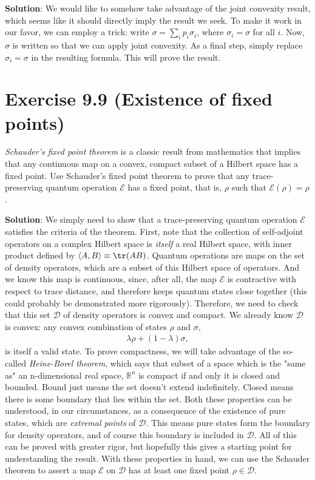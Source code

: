 \documentclass{book}
\newcommand{\mc}[1]{\mathcal{#1}}
\begin{document}
    \textbf{Solution}: We would like to somehow take advantage of the joint convexity result, which seems like it should directly imply the result we seek. To make it work in our favor, we can employ a trick: write $\sigma = \sum_i p_i \sigma_i$, where $\sigma_i = \sigma$ for all $i$. Now, $\sigma$ is written so that we can apply joint convexity. As a final step, simply replace $\sigma_i = \sigma$ in the resulting formula. This will prove the result. 
    
\section*{Exercise 9.9 (Existence of fixed points)} 
    \emph{Schauder's fixed point theorem} is a classic result from mathematics that implies that any continuous map on a convex, compact subset of a Hilbert space has a fixed point. Use Schauder’s fixed point theorem to prove that any trace-preserving quantum operation $\mc{E}$ has a fixed point, that is, $\rho$ such that $\mc{E}(\rho) = \rho$. 
    
    \textbf{Solution}: We simply need to show that a trace-preserving quantum operation $\mc{E}$ satisfies the criteria of the theorem. First, note that the collection of self-adjoint operators on a complex Hilbert space is \emph{itself} a real Hilbert space, with inner product defined by $\langle A, B \rangle \equiv \tr(A B)$. Quantum operations are maps on the set of density operators, which are a subset of this Hilbert space of operators. And we know this map is continuous, since, after all, the map $\mc{E}$ is contractive with respect to trace distance, and therefore keeps quantum states close together (this could probably be demonstrated more rigorously). Therefore, we need to check that this set $\mc{D}$ of density operators is convex and compact. We already know $\mc{D}$ is convex: any convex combination of states $\rho$ and $\sigma$, 
    \begin{align}
        \lambda \rho + (1-\lambda) \sigma,
    \end{align} is itself a valid state. To prove compactness, we will take advantage of the so-called \emph{Heine-Borel theorem}, which says that subset of a space which is the "same as" an n-dimensional real space, $\mathbb{R}^n$ is compact if and only it is closed and bounded. Bound just means the set doesn't extend indefinitely. Closed means there is some boundary that lies within the set. Both these properties can be understood, in our circumstances, as a consequence of the existence of pure states, which are \emph{extremal points} of $\mc{D}$. This means pure states form the boundary for density operators, and of course this boundary is included in $\mc{D}$. All of this can be proved with greater rigor, but hopefully this gives a starting point for understanding the result. With these properties in hand, we can use the Schauder theorem to assert a map $\mc{E}$ on $\mc{D}$ has at least one fixed point $\rho \in \mc{D}$.
    
\end{document}
